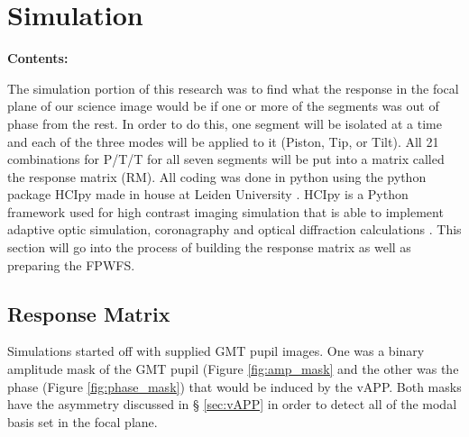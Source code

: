 
\chapter{Simulation} %

\noindent\textbf{\large Contents:}

\noindent\hrulefill
\noindent\startcontents[chapters]
\noindent{}
\noindent\hrulefill

\label{Chapter2}%

The simulation portion of this research was to find what the response in the focal plane of our science image would
be if one or more of the segments was out of phase from the rest.  In order to do this, one segment will be isolated
at a time and each of the three modes will be applied to it (Piston, Tip, or Tilt).  All 21 combinations for
P/T/T for all seven segments will be put into a matrix called the response matrix (RM).  All coding was done in
python using the python package HCIpy made in house at Leiden University \cite{por2018hcipy}.  %
HCIpy is a Python framework used for high contrast imaging simulation that is able to implement adaptive optic simulation, coronagraphy and optical diffraction calculations \cite{por2018hcipy}.
This section will go into the process of building the response matrix as well as preparing the FPWFS.


\section{Response Matrix}
\label{sec:RM}



Simulations started off with supplied GMT pupil images. %
One was
a binary amplitude mask of the GMT pupil (Figure \ref{fig:amp_mask} and the other was the phase (Figure
\ref{fig:phase_mask}) that would be induced by the vAPP.  Both masks have the asymmetry discussed in \S
\ref{sec:vAPP} in order to detect all of the modal basis set in the focal plane.  

